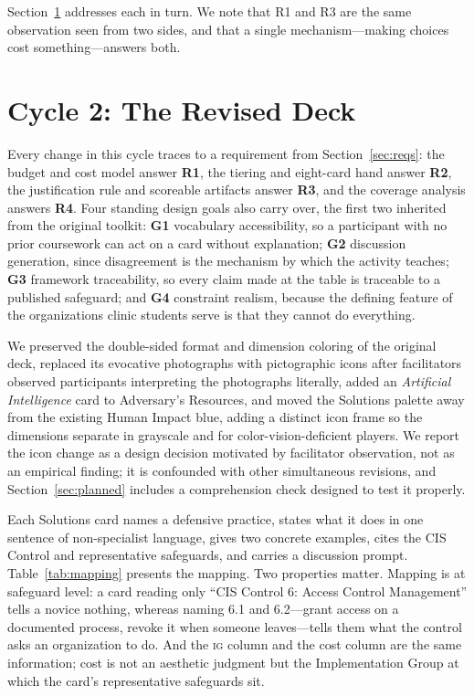 \documentclass[10pt,twocolumn,letterpaper]{article}
\newcommand{\ig}[1]{\textsc{ig#1}}
\begin{document}
Section~\ref{sec:cycle2} addresses each in turn. We note that R1 and R3 are the
same observation seen from two sides, and that a single mechanism---making
choices cost something---answers both.

\section{Cycle 2: The Revised Deck}
\label{sec:cycle2}
\label{sec:design}

Every change in this cycle traces to a requirement from
Section~\ref{sec:reqs}: the budget and cost model answer \textbf{R1}, the
tiering and eight-card hand answer \textbf{R2}, the justification rule and
scoreable artifacts answer \textbf{R3}, and the coverage analysis answers
\textbf{R4}. Four standing design goals also carry over, the first two inherited
from the original toolkit: \textbf{G1} vocabulary accessibility, so a participant with no prior
coursework can act on a card without explanation; \textbf{G2} discussion
generation, since disagreement is the mechanism by which the activity teaches;
\textbf{G3} framework traceability, so every claim made at the table is
traceable to a published safeguard; and \textbf{G4} constraint realism, because
the defining feature of the organizations clinic students serve is that they
cannot do everything.

We preserved the double-sided format and dimension coloring of the original
deck, replaced its evocative photographs with pictographic icons after
facilitators observed participants interpreting the photographs literally, added
an \emph{Artificial Intelligence} card to Adversary's Resources, and moved the
Solutions palette away from the existing Human Impact blue, adding a distinct
icon frame so the dimensions separate in grayscale and for color-vision-deficient
players. We report the icon change as a design decision motivated by facilitator
observation, not as an empirical finding; it is confounded with other
simultaneous revisions, and Section~\ref{sec:planned} includes a comprehension
check designed to test it properly.

Each Solutions card names a defensive practice, states what it does in one
sentence of non-specialist language, gives two concrete examples, cites the CIS
Control and representative safeguards, and carries a discussion prompt.
Table~\ref{tab:mapping} presents the mapping. Two properties matter. Mapping is
at safeguard level: a card reading only ``CIS Control 6: Access Control
Management'' tells a novice nothing, whereas naming 6.1 and 6.2---grant access
on a documented process, revoke it when someone leaves---tells them what the
control asks an organization to do. And the \ig{} column and the cost column are
the same information; cost is not an aesthetic judgment but the Implementation
Group at which the card's representative safeguards sit.
\end{document}
